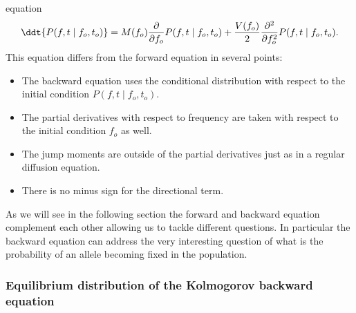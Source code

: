 equation
\begin{equation}
	\ddt{P(f, t \mid f_o, t_o)} =
	M(f_o) {\partial \over \partial f_o}P(f, t \mid f_o, t_o) +
	{V(f_o) \over 2} {\partial^2 \over \partial f_o^2} P(f, t \mid f_o, t_o).
	\label{eq_kolmogorov_backward}
\end{equation}
This equation differs from the forward equation in several points:
\begin{itemize}
	\item The backward equation uses the conditional distribution with respect
	to the initial condition $P(f, t \mid f_o, t_o)$.
	\item The partial derivatives with respect to frequency are taken with
	respect to the initial condition $f_o$ as well.
	\item The jump moments are outside of the partial derivatives just as in a
	regular diffusion equation.
	\item There is no minus sign for the directional term.
\end{itemize}
As we will see in the following section the forward and backward equation
complement each other allowing us to tackle different questions. In particular
the backward equation can address the very interesting question of what is the
probability of an allele becoming fixed in the population.

\subsubsection{Equilibrium distribution of the Kolmogorov backward equation}

